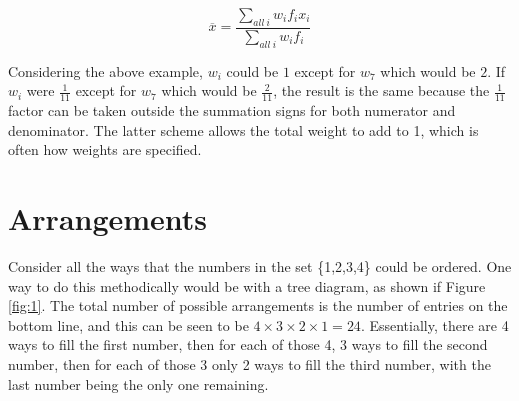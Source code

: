 \documentclass[a5paper]{article}
\begin{document}
\begin{equation}
  \overline{x} = \frac{\sum\limits_{all\ i} w_i f_i x_i}{\sum\limits_{all\ i}
    w_i f_i}
\end{equation}

Considering the above example, $w_i$ could be $1$ except for $w_7$ which would
be $2$. If $w_i$ were $\frac{1}{11}$ except for $w_7$ which would be
$\frac{2}{11}$, the result is the same because the $\frac{1}{11}$ factor can be
taken outside the summation signs for both numerator and denominator. The latter
scheme allows the total weight to add to 1, which is often how weights are
specified.

\section{Arrangements}

Consider all the ways that the numbers in the set \{1,2,3,4\} could be ordered.
One way to do this methodically would be with a tree diagram, as shown if Figure
\ref{fig:1}. The total number of possible arrangements is the number of entries
on the bottom line, and this can be seen to be $4\times 3\times 2\times 1 = 24$.
Essentially, there are 4 ways to fill the first number, then for each of those
4, 3 ways to fill the second number, then for each of those 3 only 2 ways to
fill the third number, with the last number being the only one remaining.
\end{document}
